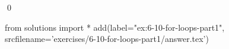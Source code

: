 
\begin{ex}
  \label{ex:6-10-for-loops-part1}
  
  \qed
\end{ex}
\begin{python0}
from solutions import *
add(label="ex:6-10-for-loops-part1",
    srcfilename='exercises/6-10-for-loops-part1/answer.tex')
\end{python0}
